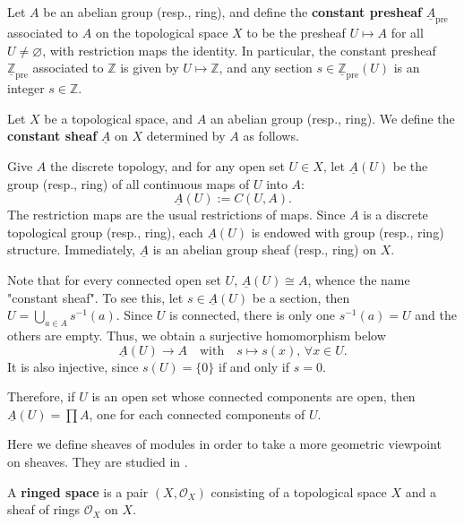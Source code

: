 \documentclass[11pt]{article}
\begin{document}
\begin{example}
    \label{eg: constant sheaf}
    \cite[Exercise II.1.1]{hartsAG}
    Let $A$ be an abelian group (resp., ring), and define the \textbf{constant presheaf} 
    $\underline{A}_{\mathrm{pre}}$ associated to $A$ on the 
    topological space $X$ to be the presheaf 
    $U \mapsto A$ for all $U \neq \varnothing$, 
    with restriction maps the identity. 
    In particular, the constant presheaf $\underline{\mathbb{Z}}_{\mathrm{pre}}$ 
    associated to $\mathbb{Z}$ is given by $U \mapsto \mathbb{Z}$, 
    and any section $s \in \underline{\mathbb{Z}}_{\mathrm{pre}}(U)$ 
    is an integer $s \in \mathbb{Z}$. 

    \cite[Example II.1.0.3]{hartsAG} 
    Let $X$ be a topological space, and $A$ an abelian group (resp., ring). 
    We define the \textbf{constant sheaf} $\underline{A}$ on $X$ determined 
    by $A$ as follows. 

    Give $A$ the discrete topology, and for any open set 
    $U \in X$, let $\underline{A} (U)$ be the group (resp., ring) of all 
    continuous maps of $U$ into $A$: 
    $$\underline{A}(U):=C(U,A).$$ 
    The restriction maps are the usual restrictions 
    of maps. Since $ A $ is a discrete topological group (resp., ring), 
    each $ \underline{A}(U) $ is endowed with group (resp., ring) structure. 
    Immediately, $ \underline{A} $ is an abelian group sheaf (resp., ring) on $ X $. 

    Note that for every connected open set $U$, 
    $\underline{A} (U) \cong A$, whence the name "constant sheaf". 
    To see this, let $s \in \underline{A}(U)$ be a section, 
    then $U=\bigcup_{a \in A} s^{-1}(a)$. 
    Since $U$ is connected, there is only one $s^{-1}(a)=U$ 
    and the others are empty. 
    Thus, we obtain a surjective homomorphism below 
    $$\underline{A}(U) \to A \quad\text{with}\quad s \mapsto s(x),\, \forall x \in U. $$ 
    It is also injective, since $ s(U)=\{0\} $ if and only if 
    $ s =0 $. 

    Therefore, if $ U $ is an open set whose connected components 
    are open, then $ \underline{A}(U)= \prod A $, 
    one for each connected components of $ U $. 

\end{example}

Here we define sheaves of modules in order to take a 
more geometric viewpoint on sheaves. 
They are studied in \cite[II.5 Sheaves of Modules]{hartsAG}.

\begin{definition}
    A \textbf{ringed space} is a pair $ (X,\mathscr{O}_{X}) $ 
    consisting of a topological space $ X $ and a sheaf of rings 
    $ \mathscr{O}_{X} $ on $ X $. 
\end{definition}
\end{document}
